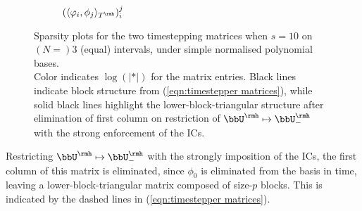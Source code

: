\begin{example}
\begin{figure}[!ht]
\begin{subfigure}{0.5\textwidth}
                \caption{$(\langle\varphi_{i}, \phi_{j}\rangle_{T^{\rmh}})^{j}_{i}$}
            \end{subfigure}
            \caption{Sparsity plots for the two timestepping matrices when $s  =  10$ on $(N  =)  3$ (equal) intervals, under simple normalised polynomial bases. \\ Color indicates $\log(|*|)$ for the matrix entries. Black lines indicate block structure from (\ref{eqn:timestepper matrices}), while solid black lines highlight the lower-block-triangular structure after elimination of first column on restriction of $\bbU^{\rmh}  \mapsto  \bbU^{\rmh}_{-}$ with the strong enforcement of the ICs.}
            \label{fig:timestepper matrices}
        \end{figure}
        
        Restricting $\bbU^{\rmh}  \mapsto  \bbU^{\rmh}_{-}$ with the strongly imposition of the ICs, the first column of this matrix is eliminated, since $\phi_{0}$ is eliminated from the basis in time, leaving a lower-block-triangular matrix composed of size-$p$ blocks. This is indicated by the dashed lines in (\ref{eqn:timestepper matrices}). 
        

\end{example}
